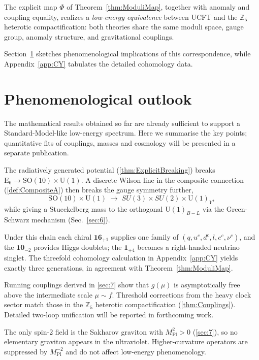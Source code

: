 \documentclass[pdflatex,sn-mathphys-num]{sn-jnl}
\theoremstyle{thmstyleone}
\theoremstyle{thmstyletwo}%
\theoremstyle{thmstylethree}%
\newcommand{\SO}[1]{\mathrm{SO(#1)}}
\newcommand{\U}[1]{\mathrm{U(#1)}}
\newcommand{\E}[1]{\mathrm{E_{#1}}}
\newcommand{\SOTen}{\SO{10}}
\newcommand{\UOne}{\U{1}}
\newcommand{\ESix}{\E{6}}
\begin{document}
The explicit map \(\Phi\) of Theorem~\ref{thm:ModuliMap},
together with anomaly and coupling equality, realizes a
\emph{low-energy equivalence} between UCFT and the
\(\mathbb Z_{5}\) heterotic compactification: both theories share the
same moduli space, gauge group, anomaly structure, and gravitational
couplings.

\bigskip
Section~\ref{sec:10} sketches phenomenological implications of this
correspondence, while Appendix~\ref{app:CY} tabulates the detailed
cohomology data.

\section{Phenomenological outlook}
\label{sec:10}
The mathematical results obtained so far are already sufficient to
support a Standard-Model-like low-energy spectrum.  Here we summarise
the key points; quantitative fits of couplings, masses and cosmology
will be presented in a separate publication.

The radiatively generated potential
(\autoref{thm:ExplicitBreaking}) breaks
\(\ESix\xrightarrow{\;}\SOTen\times \UOne\).
A discrete Wilson line in the composite connection
(\autoref{def:CompositeA}) then breaks the gauge symmetry further,
\[
  \SOTen\times \UOne
  \;\longrightarrow\;
  SU(3)\times SU(2)\times \UOne_{Y},
\]
while giving a Stueckelberg mass to the orthogonal
\(\UOne_{B-L}\) via the Green-Schwarz mechanism (Sec.~\ref{sec:6}).

Under this chain each chiral \(\mathbf{16}_{+1}\) supplies one family of
\((q,u^{c},d^{c},l,e^{c},\nu^{c})\), and the
\(\mathbf{10}_{-2}\) provides Higgs doublets; the
\(\mathbf 1_{+4}\) becomes a right-handed neutrino singlet.
The threefold co\-ho\-mo\-lo\-gy calculation in
Appendix~\ref{app:CY} yields exactly three generations, in agreement
with Theorem~\ref{thm:ModuliMap}.

Running couplings derived in \autoref{sec:7} show that
\(g(\mu)\) is asymptotically free above the intermediate scale
\(\mu\sim f\).  Threshold corrections from the heavy clock sector match
those in the \(\mathbb Z_{5}\) heterotic compactification
(\autoref{thm:Couplings}).  Detailed two-loop unification will be
reported in forthcoming work.

The only spin-2 field is the Sakharov graviton with
\(M_{\text{Pl}}^{2}>0\) (\autoref{sec:7}),
so no elementary graviton appears in the ultraviolet. Higher-curvature operators are
suppressed by \(M_{\text{Pl}}^{-2}\) and do not affect low-energy
phenomenology.
\end{document}
